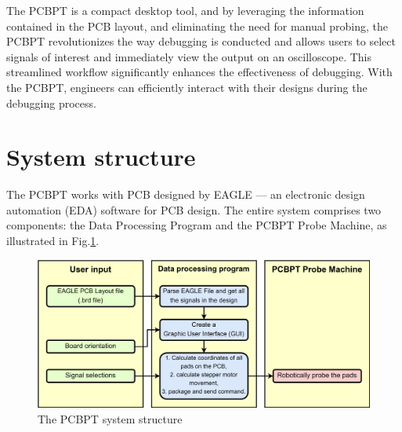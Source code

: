 \documentclass[sigconf]{acmart}
\begin{document}
The PCBPT is a compact desktop tool, and by leveraging the information contained in the PCB layout, and eliminating the need for manual probing, the PCBPT revolutionizes the way debugging is conducted and allows users to select signals of interest and immediately view the output on an oscilloscope. This streamlined workflow significantly enhances the effectiveness of debugging. With the PCBPT, engineers can efficiently interact with their designs during the debugging process.


\section{System structure}
The PCBPT works with PCB designed by EAGLE — an electronic design automation (EDA) software for PCB design. The entire system comprises two components: the Data Processing Program and the PCBPT Probe Machine, as illustrated in Fig.\ref{PCBPT_structure}.

\begin{figure}[h]
  \centering
  \includegraphics[width=\linewidth]{PCBPT_structure.png}
  \caption{The PCBPT system structure}
  \label{PCBPT_structure}
\end{figure}
\end{document}
